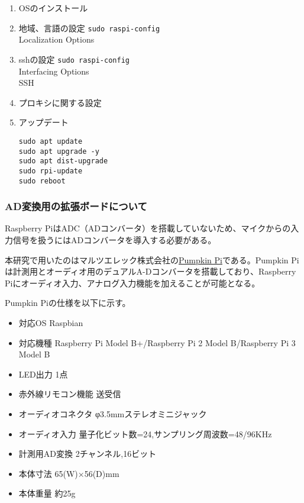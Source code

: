 \begin{enumerate}
\def\labelenumi{\arabic{enumi}.}
\item
  OSのインストール
\item
  地域、言語の設定 \texttt{sudo\ raspi-config}\\
  Localization Options
\item
  sshの設定 \texttt{sudo\ raspi-config}\\
  Interfacing Options\\
  SSH
\item
  プロキシに関する設定
\item
  アップデート

\begin{verbatim}
sudo apt update 
sudo apt upgrade -y 
sudo apt dist-upgrade
sudo rpi-update
sudo reboot
\end{verbatim}
\end{enumerate}

\hypertarget{adux5909ux63dbux7528ux306eux62e1ux5f35ux30dcux30fcux30c9ux306bux3064ux3044ux3066}{%
\subsubsection{AD変換用の拡張ボードについて}\label{adux5909ux63dbux7528ux306eux62e1ux5f35ux30dcux30fcux30c9ux306bux3064ux3044ux3066}}

Raspberry
PiはADC（ADコンバータ）を搭載していないため、マイクからの入力信号を扱うにはADコンバータを導入する必要がある。

本研究で用いたのはマルツエレック株式会社の\href{http://select.marutsu.co.jp/list/detail.php?id=258}{Pumpkin
Pi}である。Pumpkin
Piは計測用とオーディオ用のデュアルA-Dコンバータを搭載しており、Raspberry
Piにオーディオ入力、アナログ入力機能を加えることが可能となる。

Pumpkin Piの仕様を以下に示す。

\begin{itemize}
\tightlist
\item
  対応OS Raspbian
\item
  対応機種 Raspberry Pi Model B+/Raspberry Pi 2 Model B/Raspberry Pi 3
  Model B
\item
  LED出力 1点
\item
  赤外線リモコン機能 送受信
\item
  オーディオコネクタ φ3.5mmステレオミニジャック
\item
  オーディオ入力 量子化ビット数=24,サンプリング周波数=48/96KHz
\item
  計測用AD変換 2チャンネル,16ビット
\item
  本体寸法 65(W)×56(D)mm
\item
  本体重量 約25g
\end{itemize}

